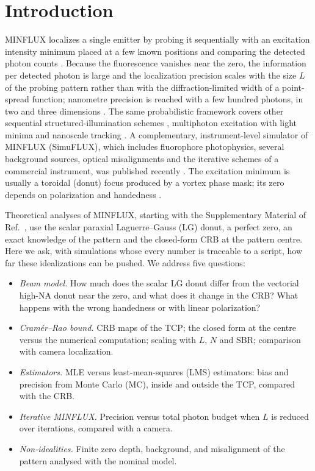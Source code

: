 \section{Introduction}\label{sec:intro}

MINFLUX localizes a single emitter by probing it sequentially with an excitation intensity
minimum placed at a few known positions and comparing the detected photon counts
\cite{Balzarotti2017}. Because the fluorescence vanishes near the zero, the information per
detected photon is large and the localization precision scales with the size $L$ of the probing
pattern rather than with the diffraction-limited width of a point-spread function; nanometre
precision is reached with a few hundred photons, in two and three dimensions
\cite{Balzarotti2017,Gwosch2020}. The same probabilistic framework covers other sequential
structured-illumination schemes \cite{Masullo2022,Masullo2022rastmin}, multiphoton excitation
with light minima \cite{MasulloStefani2022} and nanoscale tracking \cite{Stefani2023}. A
complementary, instrument-level simulator of MINFLUX (SimuFLUX), which includes fluorophore
photophysics, several background sources, optical misalignments and the iterative schemes of a
commercial instrument, was published recently \cite{MarinRies2026}. The
excitation minimum is usually a toroidal (donut) focus produced by a vortex phase mask; its zero
depends on polarization and handedness \cite{Lopez2023,Caprile2022}.

Theoretical analyses of MINFLUX, starting with the Supplementary Material of
Ref.~\cite{Balzarotti2017}, use the scalar paraxial Laguerre--Gauss (LG) donut, a perfect zero,
an exact knowledge of the pattern and the closed-form CRB at the pattern centre. Here we ask, with simulations whose every number is traceable to a script,
how far these idealizations can be pushed. We address five questions:
\begin{itemize}
\item[R1] \emph{Beam model.} How much does the scalar LG donut differ from the vectorial
high-NA donut near the zero, and what does it change in the CRB? What happens with the wrong
handedness or with linear polarization?
\item[R2] \emph{Cram\'er--Rao bound.} CRB maps of the TCP; the closed form at the centre versus
the numerical computation; scaling with $L$, $N$ and SBR; comparison with camera localization.
\item[R3] \emph{Estimators.} MLE versus least-mean-squares (LMS) estimators: bias and precision
from Monte Carlo (MC), inside and outside the TCP, compared with the CRB.
\item[R4] \emph{Iterative MINFLUX.} Precision versus total photon budget when $L$ is reduced
over iterations, compared with a camera.
\item[R5] \emph{Non-idealities.} Finite zero depth, background, and misalignment of the pattern
analysed with the nominal model.
\end{itemize}

